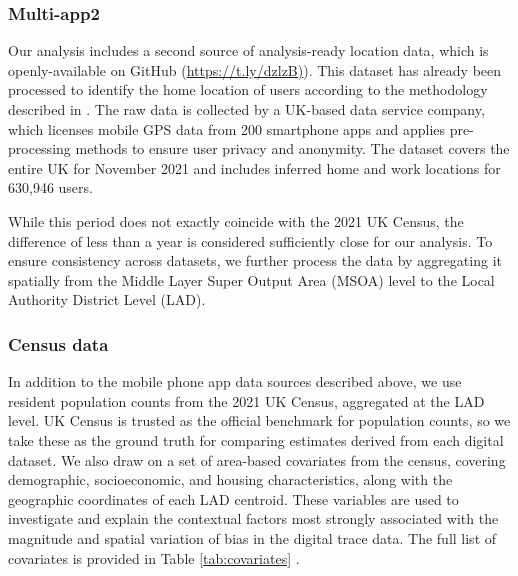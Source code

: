 \documentclass[]{rsos}%
\begin{document}
\subsubsection{Multi-app2}\label{multi-app2}

Our analysis includes a second source of analysis-ready location data,
which is openly-available on GitHub
(\href{https://t.ly/dzlzB}{https://t.ly/dzlzB)}). This dataset has already
been processed to identify the home location of users according to the
methodology described in \citep{zhong24working}. The raw data is collected by
a UK-based data service company, which licenses mobile GPS data from 200
smartphone apps and applies pre-processing methods to ensure user
privacy and anonymity. The dataset covers the entire UK for November
2021 and includes inferred home and work locations for 630,946 users.

While this period does not exactly coincide with the 2021 UK Census, the
difference of less than a year is considered sufficiently close for our
analysis. To ensure consistency across datasets, we further process the
data by aggregating it spatially from the Middle Layer Super Output Area
(MSOA) level to the Local Authority District Level (LAD).

\subsubsection{Census data}\label{census-data}

In addition to the mobile phone app data sources described above, we use
resident population counts from the 2021 UK Census, aggregated at the
LAD level. UK Census is trusted as the official benchmark for population
counts, so we take these as the ground truth for comparing estimates
derived from each digital dataset. We also draw on a set of area-based
covariates from the census, covering demographic, socioeconomic, and
housing characteristics, along with the geographic coordinates of each
LAD centroid. These variables are used to investigate and explain the
contextual factors most strongly associated with the magnitude and
spatial variation of bias in the digital trace data. The full list of
covariates is provided in Table \ref{tab:covariates} .
\end{document}

